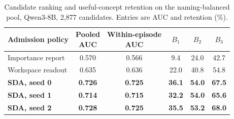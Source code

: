 \begin{table}[t]
\centering
\caption{Candidate ranking and useful-concept retention on the naming-balanced pool, Qwen3-8B, 2,877
candidates. Entries are AUC and retention (\%).}
\label{tab:namingbalanced}
\small
\setlength{\tabcolsep}{4pt}
\begin{tabular}{lccccc}
\toprule
Admission policy & \shortstack{Pooled\\AUC} & \shortstack{Within-episode\\AUC} & $B_1$ & $B_2$ & $B_3$ \\
\midrule
Importance report & 0.570 & 0.566 & 9.4 & 24.0 & 42.7 \\
Workspace readout & 0.635 & 0.636 & 22.0 & 40.8 & 54.8 \\
\textbf{SDA, seed 0} & \textbf{0.726} & \textbf{0.725} & \textbf{36.1} & \textbf{54.0} & \textbf{67.5} \\
\textbf{SDA, seed 1} & \textbf{0.714} & \textbf{0.715} & \textbf{32.2} & \textbf{54.0} & \textbf{65.6} \\
\textbf{SDA, seed 2} & \textbf{0.728} & \textbf{0.725} & \textbf{35.5} & \textbf{53.2} & \textbf{68.0} \\
\bottomrule
\end{tabular}
\end{table}
